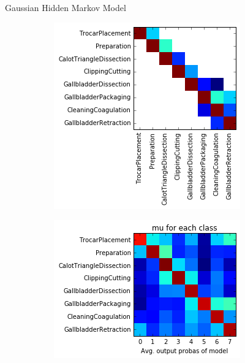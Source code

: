 \begin{frame}{Gaussian Hidden Markov Model}
	\begin{figure}
		\centering
		\begin{subfigure}{.49\textwidth}
			\centering
			\includegraphics[width=.75\linewidth]{images/index.png}
			\label{fig:dsg1}
		\end{subfigure}%
		\begin{subfigure}{.49\textwidth}
			\centering
			\includegraphics[width=.90\linewidth]{images/index2.png}
			\label{fig:dsg2}
		\end{subfigure}
		\label{fig:dsgimages}
	\end{figure}	
	
\end{frame}

